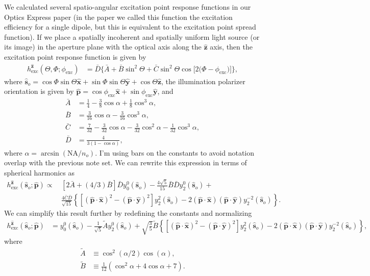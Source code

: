 \documentclass[11pt]{article}
\providecommand{\so}[1]{\mathbf{\hat{s}}_o}
\providecommand{\mh}[1]{\mathbf{\hat{#1}}}
\begin{document}
We calculated several spatio-angular excitation point response functions in our
Optics Express paper \cite{chandler17} (in the paper we called this function the
excitation efficiency for a single dipole, but this is equivalent to the
excitation point spread function). If we place a spatially incoherent and
spatially uniform light source (or its image) in the aperture plane with the
optical axis along the $\mh{z}$ axis, then the excitation point response function
is given by
\begin{align}
  h^{\mh{z}}_{\text{exc}}(\Theta, \Phi; \phi_{\text{exc}}) &= \bar{D}\{\bar{A} + \bar{B}\sin^{2}{\Theta} + \bar{C}\sin^{2}{\Theta} \cos{[2 (\Phi - \phi_{\text{exc}}})]\}\label{eq:scalarabs},
\end{align}
where
$\so{} = \cos\Phi\sin\Theta\mh{x} + \sin\Phi\sin\Theta\mh{y} + \cos\Theta\mh{z}$,
the illumination polarizer orientation is given by $\mh{p} = \cos\phi_{\text{exc}}\mh{x} + \sin\phi_{\text{exc}}\mh{y}$, and 
\begin{subequations}
\begin{align}
  \bar{A} &= \frac{1}{4} - \frac{3}{8} \cos{\alpha } + \frac{1}{8} \cos^{3}{\alpha },\\
  \bar{B} &= \frac{3}{16} \cos{\alpha } - \frac{3}{16} \cos^{3}{\alpha },\\
  \bar{C} &= \frac{7}{32} - \frac{3}{32} \cos{\alpha } - \frac{3}{32} \cos^{2}{\alpha } - \frac{1}{32} \cos^{3}{\alpha},\\
  \bar{D} &= \frac{4}{3(1 - \cos\alpha)},
\end{align}\label{eq:coefficients}%
\end{subequations}
where $\alpha = \arcsin(\text{NA}/n_o)$. I'm using bars on the constants to
avoid notation overlap with the previous note set. We can rewrite this
expression in terms of spherical harmonics as
\begin{align}
  h^{\mh{z}}_{\text{exc}}(\so{}; \mh{p}) \propto\, &[2\bar{A} + (4/3)\bar{B}]\bar{D}y_0^0(\so{}) - \frac{4\sqrt{5}}{15}\bar{B}\bar{D}y_2^0(\so{}) + \nonumber\\ &\frac{4\bar{C}\bar{D}}{\sqrt{15}}\left\{[(\mh{p}\cdot\mh{x})^2 - (\mh{p}\cdot\mh{y})^2]y_2^2(\so{}) - 2(\mh{p}\cdot\mh{x})(\mh{p}\cdot\mh{y})y_2^{-2}(\so{})\right\}. \label{eq:genpsf}
\end{align}
We can simplify this result further by redefining the constants and normalizing
\begin{align}
  h^{\mh{z}}_{\text{exc}}(\so{}; \mh{p}) &= y_0^0(\so{}) - \frac{1}{\sqrt{5}}\tilde{A}y_2^0(\so{}) + \sqrt{\frac{3}{5}}\tilde{B}\left\{[(\mh{p}\cdot\mh{x})^2 - (\mh{p}\cdot\mh{y})^2]y_2^2(\so{}) - 2(\mh{p}\cdot\mh{x})(\mh{p}\cdot\mh{y})y_2^{-2}(\so{})\right\}, \label{eq:genpsf}
\end{align}
where
\begin{subequations}
\begin{align}
  \tilde{A} &\equiv \cos^2(\alpha/2)\cos(\alpha),\\
  \tilde{B} &\equiv \frac{1}{12}(\cos^2\alpha + 4\cos\alpha + 7).
\end{align}\label{eq:coefficients}%
\end{subequations}
\end{document}
